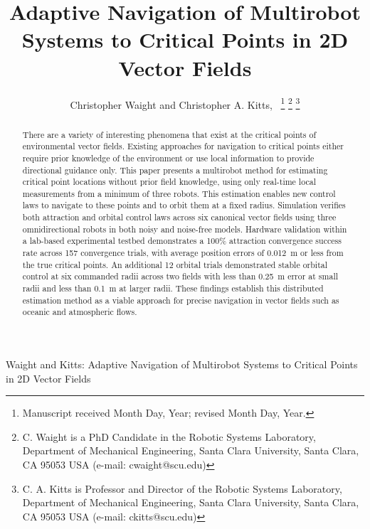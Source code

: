 \documentclass[lettersize,journal]{IEEEtran}
\begin{document}
\title{Adaptive Navigation of Multirobot Systems to Critical Points in 2D Vector Fields}
\author{Christopher Waight and Christopher A. Kitts,~
\thanks{Manuscript received Month Day, Year; revised Month Day, Year.}
\thanks{C. Waight is a PhD Candidate in the Robotic Systems Laboratory, Department of Mechanical Engineering, Santa Clara University, Santa Clara, CA 95053 USA (e-mail: cwaight@scu.edu)}
\thanks{C. A. Kitts is Professor and Director of the Robotic Systems Laboratory, Department of Mechanical Engineering, Santa Clara University, Santa Clara, CA 95053 USA (e-mail: ckitts@scu.edu)}
}
%
{Waight and Kitts: Adaptive Navigation of Multirobot Systems to Critical Points in 2D Vector Fields}


\maketitle

\begin{abstract}
    There are a variety of interesting phenomena that exist at the critical points of environmental vector fields. Existing approaches for navigation to critical points either require prior knowledge of the environment or use local information to provide directional guidance only. This paper presents a multirobot method for estimating critical point locations without prior field knowledge, using only real-time local measurements from a minimum of three robots.
    This estimation enables new control laws to navigate to these points and to orbit them at a fixed radius.
    Simulation verifies both attraction and orbital control laws across six canonical vector fields using three omnidirectional robots in both noisy and noise-free models. Hardware validation within a lab-based experimental testbed demonstrates a 100\% attraction convergence success rate across 157 convergence trials, with average position errors of 0.012~m or less from the true critical points. An additional 12 orbital trials demonstrated stable orbital control at six commanded radii across two fields with less than 0.25~m error at small radii and less than 0.1~m at larger radii. These findings establish this distributed estimation method as a viable approach for precise navigation in vector fields such as oceanic and atmospheric flows.  

\end{abstract}
\end{document}
